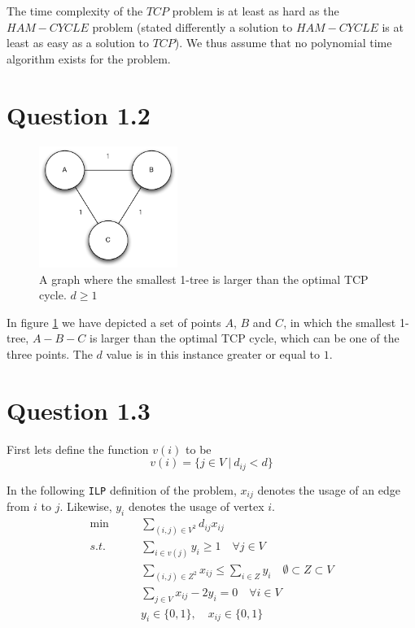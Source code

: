 \documentclass[10pt]{article}
\begin{document}
The time complexity of the $TCP$ problem is at least as hard as the $HAM-CYCLE$ problem (stated differently a solution to $HAM-CYCLE$ is at least as easy as a solution to $TCP$). We thus assume that no polynomial time algorithm exists for the problem.


\section*{Question 1.2} %
\label{sec:question_1_2}

\begin{figure}
	\centering
	\includegraphics[width=0.4\textwidth]{figures/unicycle.pdf}
	\caption{A graph where the smallest 1-tree is larger than the optimal TCP cycle. $d \geq 1$}
	\label{unicycle}
\end{figure}
In figure \ref{unicycle} we have depicted a set of points $A$, $B$ and $C$, in which the smallest 1-tree, $A-B-C$ is larger than the optimal TCP cycle, which can be one of the three points.
The $d$ value is in this instance greater or equal to $1$.

\section*{Question 1.3} %
\label{sec:question_1_3}
First lets define the function $v(i)$ to be
\begin{equation}
   v(i) = \{ j \in V\ |\ d_{ij} < d \}
\end{equation}

In the following \texttt{ILP} definition of the problem, $x_{ij}$ denotes the usage of an edge from $i$ to $j$.
Likewise, $y_i$ denotes the usage of vertex $i$.
\begin{align}
\min &\qquad \sum_{(i,j) \in V^2} d_{ij} x_{ij} \\
s.t. &\qquad \sum_{i \in v(j)} y_i \geq 1 \quad \forall j \in V \\
	 &\qquad \sum_{(i,j) \in Z^2} x_{ij} \leq \sum_{i \in Z} y_i \quad \emptyset \subset Z \subset V \label{st1}\\
	 &\qquad \sum_{j \in V } x_{ij} - 2 y_i = 0 \quad \forall i \in V \\
	 &\qquad y_i \in \{0,1\}, \quad x_{ij} \in \{0,1\}  \label{st2}
\end{align}
\end{document}

